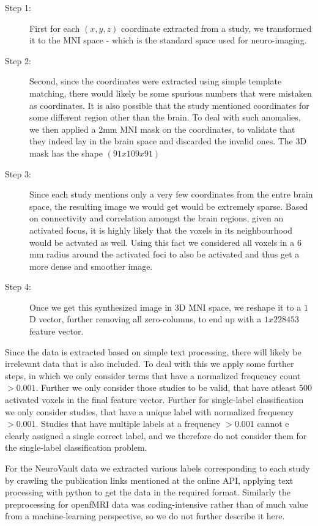 \documentclass{article} %
\begin{document}
\begin{description}
\item[Step 1: ] First for each $(x, y, z)$ coordinate extracted from a study, we transformed it to the MNI space - which is the standard space used for neuro-imaging. 
\item[Step 2: ] Second, since the coordinates were extracted using simple template matching, there would likely be some spurious numbers that were mistaken as coordinates. It is also possible that the study mentioned coordinates for some different region other than the brain. To deal with such anomalies, we then applied a 2mm MNI mask on the coordinates, to validate that they indeed lay in the brain space and discarded the invalid ones. The 3D mask has the shape $(91 x 109 x 91)$ 
\item[Step 3: ] Since each study mentions only a very few coordinates from the entre brain space, the resulting image we would get would be extremely sparse. Based on connectivity and correlation amongst the brain regions, given an activated focus, it is highly likely that the voxels in its neighbourhood would be actvated as well. Using this fact we considered all voxels in a $6$ mm radius around the activated foci to also be activated and thus get a more dense and smoother image.
\item[Step 4: ] Once we get this synthesized image in $3$D MNI space, we reshape it to a $1$D vector, further removing all zero-columns, to end up with a $1 x 228453$ feature vector.  
\end{description}

Since the data is extracted based on simple text processing, there will likely be irrelevant data that is also included. To deal with this we apply some further steps, in which we only consider terms that have a normalized frequency count $ > 0.001$. Further we only consider those studies to be valid, that have atleast 500 activated voxels in the final feature vector. Further for single-label classification we only consider studies, that have a unique label with normalized frequency  $ > 0.001$. Studies that have multiple labels at a frequency $ > 0.001$ cannot e clearly assigned a single correct label, and we therefore do not consider them for the single-label classification problem.

For the NeuroVault data we extracted various labels corresponding to each study by crawling the publication links mentioned at the online API, applying text processing with python to get the data in the required format. Similarly the preprocessing for openfMRI data was coding-intensive rather than of much value from a machine-learning perspective, so we do not further describe it here.
\end{document}
